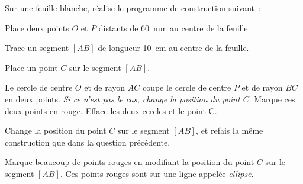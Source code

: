 Sur une feuille blanche, réalise le programme de construction suivant :
\begin{myenumerate}
  \item Place deux points $O$ et $P$ distants de 60~mm au centre de la
    feuille.
  \item Trace un segment $[AB]$ de longueur 10~cm au centre de la feuille.
  \item Place un point $C$ sur le segment $[AB]$.
  \item Le cercle de centre $O$ et de rayon $AC$ coupe le cercle de
    centre $P$ et de rayon $BC$ en deux points. {\em Si ce n'est pas
      le cas, change la position du point $C$}. Marque ces deux points
    en rouge. Efface les deux cercles et le point C.
  \item Change la position du point $C$ sur le segment $[AB]$, et refais la même construction que dans la question précédente.
\end{myenumerate}
Marque beaucoup de points rouges en modifiant la position du point $C$
sur le segment $[AB]$. Ces points rouges sont sur une ligne appelée
{\em ellipse}.
